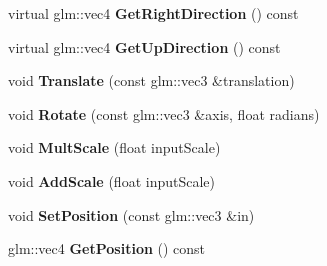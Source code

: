 \begin{DoxyCompactItemize}
\item 
\hypertarget{class_scene_object_ab96fed2fb77d81c8d1c2735fbf2a998a}{}virtual glm\+::vec4 {\bfseries Get\+Right\+Direction} () const \label{class_scene_object_ab96fed2fb77d81c8d1c2735fbf2a998a}

\item 
\hypertarget{class_scene_object_ad8828989c033b25c996cf025d7e86f54}{}virtual glm\+::vec4 {\bfseries Get\+Up\+Direction} () const \label{class_scene_object_ad8828989c033b25c996cf025d7e86f54}

\item 
\hypertarget{class_scene_object_a04868377580069b0ee9d202bdb1b7159}{}void {\bfseries Translate} (const glm\+::vec3 \&translation)\label{class_scene_object_a04868377580069b0ee9d202bdb1b7159}

\item 
\hypertarget{class_scene_object_a0d27f5853e8e1718b1a77f0f1a6d4551}{}void {\bfseries Rotate} (const glm\+::vec3 \&axis, float radians)\label{class_scene_object_a0d27f5853e8e1718b1a77f0f1a6d4551}

\item 
\hypertarget{class_scene_object_a00d73ad3f7d77bfc0d3c1869decb97ea}{}void {\bfseries Mult\+Scale} (float input\+Scale)\label{class_scene_object_a00d73ad3f7d77bfc0d3c1869decb97ea}

\item 
\hypertarget{class_scene_object_a40d7194cf79cad6ee3a2fa7c3d8ed95c}{}void {\bfseries Add\+Scale} (float input\+Scale)\label{class_scene_object_a40d7194cf79cad6ee3a2fa7c3d8ed95c}

\item 
\hypertarget{class_scene_object_a1903672e77e88a1e220fcfa8e6afc1d4}{}void {\bfseries Set\+Position} (const glm\+::vec3 \&in)\label{class_scene_object_a1903672e77e88a1e220fcfa8e6afc1d4}

\item 
\hypertarget{class_scene_object_ac52870b92ce4cebdd153d44754d1ca7c}{}glm\+::vec4 {\bfseries Get\+Position} () const \label{class_scene_object_ac52870b92ce4cebdd153d44754d1ca7c}

\end{DoxyCompactItemize}

